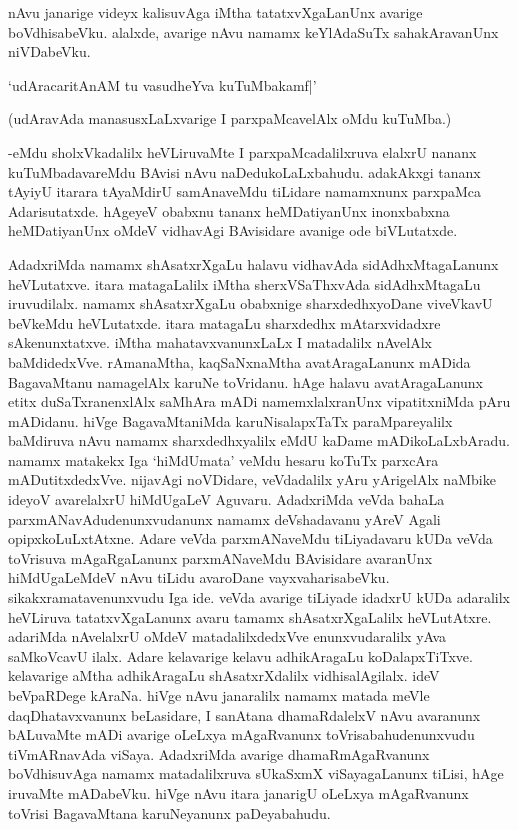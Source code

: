 nAvu janarige videyx kalisuvAga iMtha tatatxvXgaLanUnx avarige boVdhisabeVku. alalxde, avarige nAvu namamx keYlAdaSuTx sahakAravanUnx niVDabeVku.

\begin{shloka}
`udAracaritAnAM tu vasudheYva kuTuMbakamf|'
\end{shloka}

(udAravAda manasusxLaLxvarige I parxpaMcavelAlx oMdu kuTuMba.)

-eMdu sholxVkadalilx heVLiruvaMte I parxpaMcadalilxruva elalxrU nananx kuTuMbadavareMdu BAvisi nAvu naDedukoLaLxbahudu. adakAkxgi tananx tAyiyU itarara tAyaMdirU samAnaveMdu tiLidare namamxnunx parxpaMca Adarisutatxde. hAgeyeV obabxnu tananx heMDatiyanUnx inonxbabxna heMDatiyanUnx oMdeV vidhavAgi BAvisidare avanige ode biVLutatxde.

AdadxriMda namamx shAsatxrXgaLu halavu vidhavAda sidAdhxMtagaLanunx heVLutatxve. itara matagaLalilx iMtha sherxVSaThxvAda sidAdhxMtagaLu iruvudilalx. namamx shAsatxrXgaLu obabxnige sharxdedhxyoDane viveVkavU beVkeMdu heVLutatxde. itara matagaLu sharxdedhx mAtarxvidadxre sAkenunxtatxve. iMtha mahatavxvanunxLaLx I matadalilx nAvelAlx baMdidedxVve. rAmanaMtha, kaqSaNxnaMtha avatAragaLanunx mADida BagavaMtanu namagelAlx karuNe toVridanu. hAge halavu avatAragaLanunx etitx duSaTxranenxlAlx saMhAra mADi namemxlalxranUnx 
vipatitxniMda pAru mADidanu. hiVge BagavaMtaniMda karuNisalapxTaTx paraMpareyalilx baMdiruva nAvu namamx sharxdedhxyalilx eMdU kaDame mADikoLaLxbAradu. namamx matakekx Iga `hiMdUmata' veMdu hesaru koTuTx parxcAra mADutitxdedxVve. nijavAgi noVDidare, veVdadalilx yAru yArigelAlx naMbike ideyoV avarelalxrU hiMdUgaLeV Aguvaru. AdadxriMda veVda bahaLa parxmANavAdudenunxvudanunx namamx deVshadavanu yAreV Agali opipxkoLuLxtAtxne. Adare veVda parxmANaveMdu tiLiyadavaru kUDa veVda toVrisuva mAgaRgaLanunx parxmANaveMdu BAvisidare 
avaranUnx hiMdUgaLeMdeV nAvu tiLidu avaroDane vayxvaharisabeVku. sikakxramatavenunxvudu Iga ide. veVda avarige tiLiyade idadxrU kUDa adaralilx heVLiruva tatatxvXgaLanunx avaru tamamx shAsatxrXgaLalilx heVLutAtxre. adariMda nAvelalxrU oMdeV matadalilxdedxVve enunxvudaralilx yAva saMkoVcavU ilalx. Adare kelavarige kelavu adhikAragaLu koDalapxTiTxve. kelavarige aMtha adhikAragaLu shAsatxrXdalilx vidhisalAgilalx. ideV beVpaRDege kAraNa. hiVge nAvu janaralilx namamx matada meVle daqDhatavxvanunx beLasidare, I sanAtana 
dhamaRdalelxV nAvu avaranunx bALuvaMte mADi avarige oLeLxya mAgaRvanunx toVrisabahudenunxvudu tiVmARnavAda viSaya. AdadxriMda avarige dhamaRmAgaRvanunx boVdhisuvAga namamx matadalilxruva sUkaSxmX viSayagaLanunx tiLisi, hAge iruvaMte mADabeVku. hiVge nAvu itara janarigU oLeLxya mAgaRvanunx toVrisi BagavaMtana karuNeyanunx paDeyabahudu.


\endchapter
